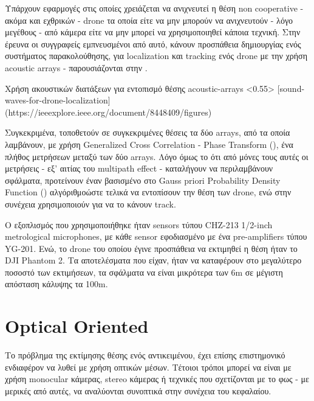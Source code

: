 Υπάρχουν εφαρμογές στις οποίες χρειάζεται να ανιχνευτεί η θέση non cooperative - ακόμα και εχθρικών - drone τα οποία είτε να μην μπορούν να ανιχνευτούν - λόγο μεγέθους - από κάμερα είτε να μην μπορεί να χρησιμοποιηθεί κάποια  τεχνική.
Στην έ\-ρ\-ευ\-να \cite{sound-waves-for-drone-localization} οι συγγραφείς εμπνευσμένοι από αυτό, κάνουν προσπάθεια δημιουργίας ενός συστήματος παρακολούθησης, για localization και tracking ενός drone με την χρήση acoustic arrays - παρουσιάζονται στην . 

%
{Χρήση ακουστικών διατάξεων για εντοπισμό θέσης}%
{acoustic-arrays}%
<0.55>%
[sound-waves-for-drone-localization]%
(https://ieeexplore.ieee.org/document/8448409/figures)

Συγκεκριμένα, τοποθετούν σε συγκεκριμένες θέσεις τα δύο arrays, από τα οποία λα\-μβά\-νουν, με χρήση Generalized Cross Correlation - Phase Transform (), ένα πλήθος μετρήσεων  μεταξύ των δύο arrays. Λόγο όμως το ότι από μόνες τους αυτές οι
μετρήσεις - εξ' αιτίας του multipath effect - καταλήγουν να περιλαμβάνουν σφάλματα, προτείνουν έναν βασισμένο στο Gauss
priori Probability Density Function () αλγόριθμο\udot ώστε τελικά να εντοπίσουν την θέση των drone, ενώ στην συνέχεια χρησιμοποιούν  για να το κάνουν track.

Ο εξοπλισμός που χρησιμοποιήθηκε ήταν sensors τύπου CHZ-213 1/2-inch me\-tro\-lo\-gi\-cal microphones, με κάθε sensor εφοδιασμένο με ένα pre-amplifiers τύπου YG-201. Ενώ, το drone του οποίου έγινε προσπάθεια να εκτιμηθεί η θέση ήταν το DJI Pha\-ntom 2. Τα αποτελέσματα που είχαν, ήταν να καταφέρουν στο μεγαλύτερο ποσοστό των εκτιμήσεων, τα σφάλματα να είναι μικρότερα των 6m σε μέγιστη απόσταση κάλυψης τα 100m.  

\section{Optical Oriented} \label{sec:related-optical}
Το πρόβλημα της εκτίμησης θέσης ενός αντικειμένου, έχει επίσης επιστημονικό ε\-νδια\-φέ\-ρον να λυθεί με χρήση οπτικών μέσων. Τέτοιοι τρόποι μπορεί να είναι με χρήση mo\-no\-cu\-lar κάμερας, stereo κάμερας ή τεχνικές που σχετίζονται με το φως - με μερικές από αυτές, να αναλύονται συνοπτικά στην συνέχεια του κεφαλαίου.


